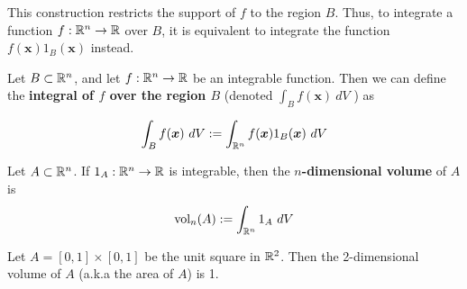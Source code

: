     This construction restricts the support of $f$ to the region $B$.  Thus, to integrate a function $f: \mathbb{R}^n \to \mathbb{R}$ over $B$, it is equivalent to integrate the function $f(\bm{x})1_B(\bm{x})$ instead.

    \begin{definition}
     Let $B \subset \mathbb{R}^n$, and let $f : \mathbb{R}^n \to \mathbb{R}$ be an integrable function.  Then we can define the \textbf{integral of $f$ over the region $B$} (denoted $\int_B f(\bm{x}) \ dV$ )   as

    $$\int_B f(\bm{x}) \ dV := \int_{\mathbb{R}^n} f(\bm{x})1_B(\bm{x}) \ dV$$
     
    \end{definition}
    

    \begin{definition}
    Let $A \subset \mathbb{R}^n$.  If $1_A : \mathbb{R}^n \to \mathbb{R}$ is integrable, then the $n$\textbf{-dimensional volume} of $A$ is $$\textnormal{vol}_n(A) := \int_{\mathbb{R}^n} 1_A \ dV$$
    \end{definition}

    \begin{example}
        Let $A = [0,1] \times [0,1]$ be the unit square  in $\mathbb{R}^2$.  Then the 2-dimensional volume of $A$ (a.k.a the area of $A$) is 1.
    \end{example}


